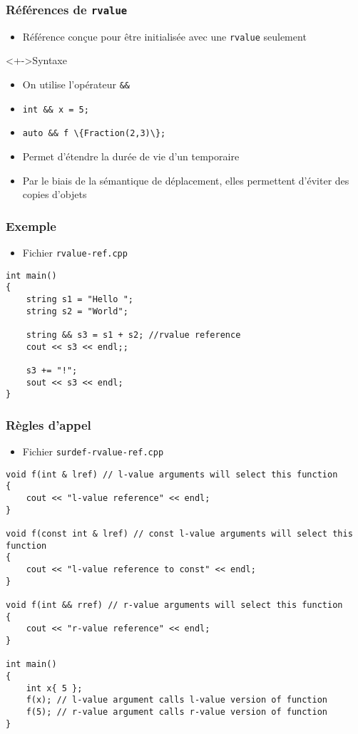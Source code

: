 \begin{frame}
\frametitle{Références de \texttt{rvalue}}
\begin{itemize}[<+->]
\item Référence conçue pour être initialisée avec une \texttt{rvalue} seulement
\end{itemize}
\begin{exampleblock}<+->{Syntaxe}
	\begin{itemize}[<+->]
	\item On utilise l'opérateur \texttt{\&\&}
	\item \lstinline|int && x = 5;|
	\item \lstinline|auto && f \{Fraction(2,3)\};|
	\end{itemize}
\end{exampleblock}
\begin{itemize}[<+->]
\item Permet d'étendre la durée de vie d'un temporaire
\item Par le biais de la sémantique de déplacement, elles permettent d'éviter des copies d'objets
\end{itemize}
\end{frame}

\begin{frame}[containsverbatim]
\frametitle{Exemple}
\begin{itemize}
\item Fichier \texttt{rvalue-ref.cpp}
\end{itemize}
\begin{lstlisting}
int main()
{
	string s1 = "Hello ";
	string s2 = "World";
  	
	string && s3 = s1 + s2; //rvalue reference
	cout << s3 << endl;;

	s3 += "!";
	sout << s3 << endl;
}
\end{lstlisting}
\end{frame}

\begin{frame}[containsverbatim]
\frametitle{Règles d'appel}
\begin{itemize}
\item Fichier \texttt{surdef-rvalue-ref.cpp}
\end{itemize}
\begin{lstlisting}
void f(int & lref) // l-value arguments will select this function
{
	cout << "l-value reference" << endl;
}

void f(const int & lref) // const l-value arguments will select this function
{
	cout << "l-value reference to const" << endl;
}
 
void f(int && rref) // r-value arguments will select this function
{
	cout << "r-value reference" << endl;
}
 
int main()
{
	int x{ 5 };
	f(x); // l-value argument calls l-value version of function
	f(5); // r-value argument calls r-value version of function
}
\end{lstlisting}
\end{frame}

